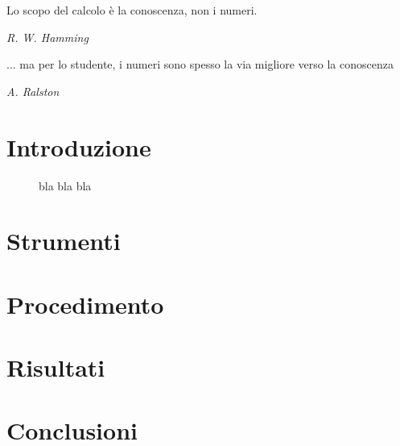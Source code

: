 \documentclass[a4paper]{article}
\author{
  R. Gianmaria,
  L. Tagliavini,
  S. Volpe
}
\date{
	Universit\`a di Bologna \\
  \today
}
\begin{document}
\maketitle
\thispagestyle{empty}

\epigraph{Lo scopo del calcolo è la conoscenza, non i numeri.}
{\textit{R. W. Hamming}}
\epigraph{... ma per lo studente, i numeri sono spesso la via migliore verso la
conoscenza}
{\textit{A. Ralston}}

\section{Introduzione}

\begin{figure}
    \begin{center}
        \scalebox{0.65}{}
    \end{center}
    \caption{bla bla bla}
\end{figure}

\section{Strumenti}

\section{Procedimento}

\section{Risultati}

\section{Conclusioni}
\end{document}

